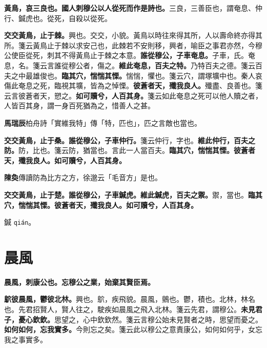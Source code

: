 
\textbf{黃鳥，哀三良也。國人刺穆公以人從死而作是詩也。}{\footnotesize 三良，三善臣也，謂奄息、仲行、鍼虎也。從死，自殺以從死。}

\textbf{交交黃鳥，止于棘。}{\footnotesize 興也。交交，小貌。黃鳥以時往來得其所，人以壽命終亦得其所。箋云黃鳥止于棘以求安己也，此棘若不安則移，興者，喻臣之事君亦然，今穆公使臣從死，刺其不得黃鳥止于棘之本意。}\textbf{誰從穆公，子車奄息。}{\footnotesize 子車，氏。奄息，名。箋云言誰從穆公者，傷之。}\textbf{維此奄息，百夫之特。}{\footnotesize 乃特百夫之德。箋云百夫之中最雄俊也。}\textbf{臨其穴，惴惴其慄。}{\footnotesize 惴惴，懼也。箋云穴，謂塚壙中也。秦人哀傷此奄息之死，臨視其壙，皆為之悼慄。}\textbf{彼蒼者天，殲我良人。}{\footnotesize 殲盡、良善也。箋云言彼蒼者天，愬之。}\textbf{如可贖兮，人百其身。}{\footnotesize 箋云如此奄息之死可以他人贖之者，人皆百其身，謂一身百死猶為之，惜善人之甚。}

\begin{quoting}\textbf{馬瑞辰}柏舟詩「實維我特」傳「特，匹也」，匹之言敵也當也。\end{quoting}

\textbf{交交黃鳥，止于桑。誰從穆公，子車仲行。}{\footnotesize 箋云仲行，字也。}\textbf{維此仲行，百夫之防。}{\footnotesize 防，比也。箋云防，猶當也。言此一人當百夫。}\textbf{臨其穴，惴惴其慄。彼蒼者天，殲我良人。如可贖兮，人百其身。}

\begin{quoting}\textbf{陳奐}傳讀防為比方之方，徐邈云「毛音方」是也。\end{quoting}

\textbf{交交黃鳥，止于楚。誰從穆公，子車鍼虎。維此鍼虎，百夫之禦。}{\footnotesize 禦，當也。}\textbf{臨其穴，惴惴其慄。彼蒼者天，殲我良人。如可贖兮，人百其身。}

\begin{quoting}鍼 \texttt{qián}。\end{quoting}

\section{晨風}


\textbf{晨風，刺康公也。忘穆公之業，始棄其賢臣焉。}

\textbf{鴥彼晨風，鬱彼北林。}{\footnotesize 興也。鴥，疾飛貌。晨風，鸇也。鬱，積也。北林，林名也。先君招賢人，賢人往之，駛疾如晨風之飛入北林。箋云先君，謂穆公。}\textbf{未見君子，憂心欽欽。}{\footnotesize 思望之，心中欽欽然。箋云言穆公始未見賢者之時，思望而憂之。}\textbf{如何如何，忘我實多。}{\footnotesize 今則忘之矣。箋云此以穆公之意責康公，如何如何乎，女忘我之事實多。}

